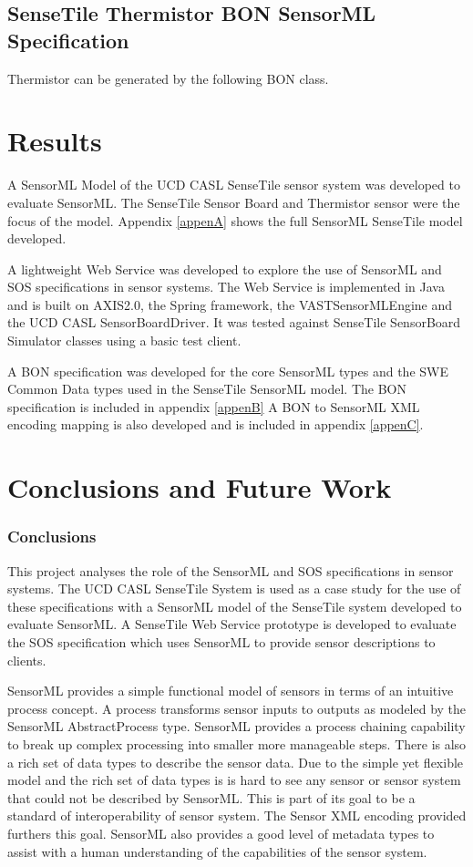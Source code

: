 \documentclass[]{final_report}
\begin{document}
\section{SenseTile Thermistor BON SensorML Specification }
Thermistor can be generated by the following BON class.

\chapter{Results}

A  SensorML Model of the UCD CASL SenseTile sensor system was developed to evaluate SensorML. The SenseTile Sensor Board and Thermistor sensor were the focus of the model. Appendix \ref{appenA} shows the full SensorML SenseTile model developed.

A lightweight Web Service was developed to explore the use of SensorML and SOS specifications in sensor systems. The Web Service is implemented in Java and is built on AXIS2.0, the Spring framework, the VASTSensorMLEngine and the UCD CASL SensorBoardDriver. It was tested against SenseTile SensorBoard Simulator classes using a basic test client.

A BON specification was developed for the core SensorML types and the SWE Common Data types used in the SenseTile SensorML model. The BON specification is included in appendix \ref{appenB} A BON to SensorML XML encoding mapping is also developed and is included in appendix \ref{appenC}.

\chapter{ Conclusions and Future Work}
\subsection{Conclusions}
This project analyses the role of the SensorML and SOS specifications in sensor systems. The UCD CASL SenseTile System is used as a case study for the use of these specifications with a SensorML model of the SenseTile system developed to evaluate SensorML. A SenseTile Web Service prototype is developed to evaluate the SOS specification which uses SensorML to provide sensor descriptions to clients. 

SensorML provides a simple functional model of sensors in terms of an intuitive process concept. A process transforms sensor inputs to outputs as modeled by the SensorML AbstractProcess type. SensorML provides a process chaining capability to break up complex processing into smaller more manageable steps. There is also a rich set of data types to describe the sensor data. Due to the simple yet flexible model and the rich set of data types is is hard to see any sensor or sensor system that could not be described by SensorML.
This is part of its goal to be a standard of interoperability of sensor system. The Sensor XML encoding provided furthers this goal. SensorML also provides a good level of metadata types to assist with a human understanding of the capabilities of the sensor system.
\end{document}
